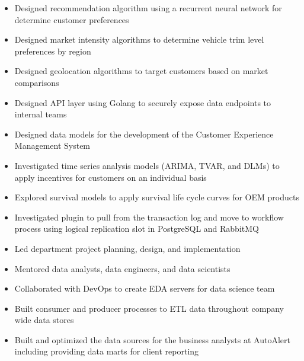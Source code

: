 
\ProjectExperienceExpandedTwoSection
{
    \begin{itemize}
        \item Designed recommendation algorithm using a recurrent neural network
        for determine customer preferences
        \item Designed market intensity algorithms to determine vehicle trim
        level preferences by region
        \item Designed geolocation algorithms to target customers based on
        market comparisons
        \item Designed API layer using Golang to securely expose data endpoints
        to internal teams
        \item Designed data models for the development of the Customer
        Experience Management System
        \item Investigated time series analysis models (ARIMA, TVAR, and DLMs)
        to apply incentives for customers on an individual basis
        \item Explored survival models to apply survival life cycle curves for
        OEM products
        \item Investigated plugin to pull from the transaction log and move to
        workflow process using logical replication slot in PostgreSQL and
        RabbitMQ
    \end{itemize}
}
{
    \begin{itemize}
        \item Led department project planning, design, and implementation
        \item Mentored data analysts, data engineers, and data scientists
        \item Collaborated with DevOps to create EDA servers for data science
        team
        \item Built consumer and producer processes to ETL data throughout
        company wide data stores
        \item Built and optimized the data sources for the business analysts at
        AutoAlert including providing data marts for client reporting
    \end{itemize}
}

\vspace*{0.1 in}

